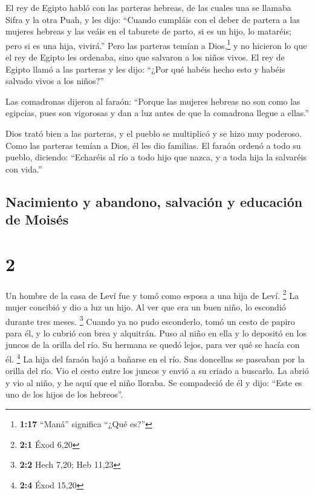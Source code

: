  El rey de Egipto habló con las parteras hebreas, de las
cuales una se llamaba Sifra y la otra Puah,  y les dijo:
``Cuando cumpláis con el deber de partera a las mujeres hebreas y las
veáis en el taburete de parto, si es un hijo, lo mataréis; pero si es
una hija, vivirá.''  Pero las parteras temían a
Dios,\footnote{\textbf{1:17} ``Maná'' significa ``¿Qué es?''} y no
hicieron lo que el rey de Egipto les ordenaba, sino que salvaron a los
niños vivos.  El rey de Egipto llamó a las parteras y les
dijo: ``¿Por qué habéis hecho esto y habéis salvado vivos a los niños?''

 Las comadronas dijeron al faraón: ``Porque las mujeres
hebreas no son como las egipcias, pues son vigorosas y dan a luz antes
de que la comadrona llegue a ellas.''

 Dios trató bien a las parteras, y el pueblo se
multiplicó y se hizo muy poderoso.  Como las parteras
temían a Dios, él les dio familias.  El faraón ordenó a
todo su pueblo, diciendo: ``Echaréis al río a todo hijo que nazca, y a
toda hija la salvaréis con vida.''

\hypertarget{nacimiento-y-abandono-salvaciuxf3n-y-educaciuxf3n-de-moisuxe9s}{%
\subsection{Nacimiento y abandono, salvación y educación de
Moisés}\label{nacimiento-y-abandono-salvaciuxf3n-y-educaciuxf3n-de-moisuxe9s}}

\hypertarget{section-1}{%
\section{2}\label{section-1}}

 Un hombre de la casa de Leví fue y tomó como esposa a una
hija de Leví. \footnote{\textbf{2:1} Éxod 6,20}  La mujer
concibió y dio a luz un hijo. Al ver que era un buen niño, lo escondió
durante tres meses. \footnote{\textbf{2:2} Hech 7,20; Heb 11,23}
 Cuando ya no pudo esconderlo, tomó un cesto de papiro
para él, y lo cubrió con brea y alquitrán. Puso al niño en ella y lo
depositó en los juncos de la orilla del río.  Su hermana
se quedó lejos, para ver qué se hacía con él. \footnote{\textbf{2:4}
  Éxod 15,20}  La hija del faraón bajó a bañarse en el
río. Sus doncellas se paseaban por la orilla del río. Vio el cesto entre
los juncos y envió a su criado a buscarlo.  La abrió y vio
al niño, y he aquí que el niño lloraba. Se compadeció de él y dijo:
``Este es uno de los hijos de los hebreos''.

